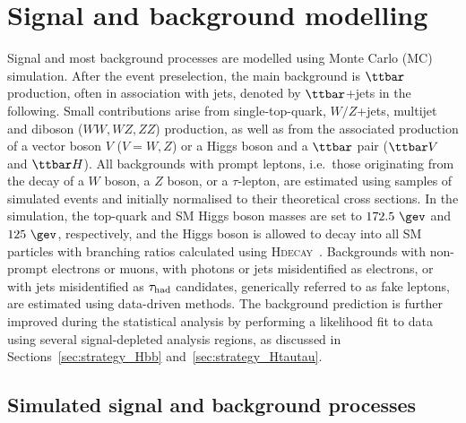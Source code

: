 \section{Signal and background modelling}
\label{sec:signal_background_model}

Signal and most background processes are modelled using Monte Carlo (MC) simulation.
After the event preselection, the main background is $\ttbar$ production, often in association with jets, denoted by $\ttbar$+jets in the following.
Small contributions arise from single-top-quark, $W/Z$+jets, multijet and diboson ($WW,WZ,ZZ$) production, as well as from the associated 
production of a vector boson $V$ ($V=W,Z$) or a Higgs boson and a $\ttbar$ pair ($\ttbar V$ and $\ttbar H$). All backgrounds 
with prompt leptons, i.e.\ those originating from the decay of a $W$ boson, a $Z$ boson, or a $\tau$-lepton,
are estimated using samples of simulated events and initially normalised to their theoretical cross sections.
In the simulation, the top-quark and SM Higgs boson masses are set to $172.5~\gev$ and $125~\gev$, respectively,
and the Higgs boson is allowed to decay into all SM particles with branching ratios calculated using \textsc{Hdecay}~\cite{Djouadi:1997yw}.  
Backgrounds with non-prompt electrons or muons, with photons or jets misidentified as electrons, or with jets misidentified as $\tau_{\mathrm{had}}$ candidates, 
generically referred to as fake leptons, are estimated using data-driven methods. 
The background prediction is further improved during the statistical analysis by performing a likelihood 
fit to data using several signal-depleted analysis regions, as discussed in Sections~\ref{sec:strategy_Hbb} and~\ref{sec:strategy_Htautau}.

\subsection{Simulated signal and background processes}
\label{sec:simulations}

